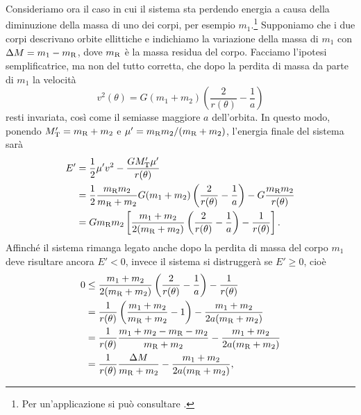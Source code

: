 {Consideriamo ora il caso in cui il sistema sta perdendo energia a causa della
diminuzione della massa di uno dei corpi, per esempio
$m_1$.\footnote{Per un'applicazione si può consultare
  \textcite{padmanabhan:stars}.}
Supponiamo che i due corpi descrivano orbite ellittiche e indichiamo la
variazione della massa di $m_1$ con $\Delta M = m_1 - m_\textup{R}$, dove
$m_\textup{R}$ è la massa residua del corpo. Facciamo l'ipotesi semplificatrice,
ma non del tutto corretta, che dopo la perdita di massa da parte di $m_1$ la
velocità
\begin{equation}
  v^2(\theta) = G(m_1 + m_2)
  \left(
    \frac{2}{r(\theta)} - \frac{1}{a}
  \right)
\end{equation}
resti invariata, così come il semiasse maggiore $a$ dell'orbita. In questo modo,
ponendo $M'_\textup{T}=m_\textup{R}+m_2$ e $\mu' = m_\textup{R}m_2/(m_\textup{R}
+ m_2)$, l'energia finale del sistema sarà
\begin{equation}
  \begin{split}
    E' &= \frac{1}{2}\mu'v^2 - \frac{GM'_\textup{T}\mu'}{r(\theta)} \\
    &= \frac{1}{2}\frac{m_\textup{R}m_2}{m_\textup{R} + m_2}G(m_1 + m_2)
    \left(
      \frac{2}{r(\theta)} - \frac{1}{a}
    \right) - G\frac{m_\textup{R}m_2}{r(\theta)} \\
    &= Gm_\textup{R}m_2
    \left[
      \frac{m_1 + m_2}{2(m_\textup{R} + m_2)}
      \left(
        \frac{2}{r(\theta)} - \frac{1}{a}
      \right) - \frac{1}{r(\theta)}
    \right].
  \end{split}
\end{equation}
Affinché il sistema rimanga legato anche dopo la perdita di massa del corpo
$m_1$ deve risultare ancora $E' < 0$, invece il sistema si distruggerà se $E'
\geq 0$, cioè
\begin{equation}
  \begin{split}
    0 &\leq \frac{m_1 + m_2}{2(m_\textup{R} + m_2)}
    \left(
      \frac{2}{r(\theta)} - \frac{1}{a}
    \right) - \frac{1}{r(\theta)} \\
    &= \frac{1}{r(\theta)}
    \left(
      \frac{m_1 + m_2}{m_\textup{R} + m_2} - 1
    \right) - \frac{m_1 + m_2}{2a(m_\textup{R} + m_2)} \\
    &= \frac{1}{r(\theta)}\frac{m_1 + m_2 - m_\textup{R} - m_2}{m_\textup{R} +
      m_2} - \frac{m_1 + m_2}{2a(m_\textup{R} + m_2)} \\
    &= \frac{1}{r(\theta)}\frac{\Delta M}{m_\textup{R} +
      m_2} - \frac{m_1 + m_2}{2a(m_\textup{R} + m_2)},

\end{split}
\end{equation}}
